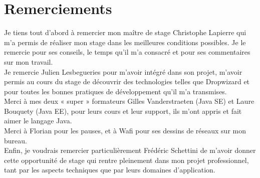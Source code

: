 \chapter*{Remerciements}


Je tiens tout d’abord à remercier mon maître de stage Christophe Lapierre qui m’a permis de réaliser mon stage dans les meilleures conditions possibles. 
Je le remercie pour ses conseils, le temps qu’il m’a consacré et pour ses commentaires sur mon travail. \\

Je remercie Julien Lesbegueries pour m'avoir intégré dans son projet, m'avoir permis au cours du stage de découvrir des technologies telles que Dropwizard et pour toutes les bonnes pratiques de développement qu'il m'a transmises.\\

Merci à mes deux « super » formateurs Gilles Vanderstraeten (Java SE) et Laure Bouquety (Java EE), pour leurs cours et leur support, ils m'ont appris et fait aimer le langage Java. \\

Merci à Florian pour les pauses, et à Wafi pour ses dessins de réseaux sur mon bureau.\\

Enfin, je voudrais remercier particulièrement Frédéric Schettini de m’avoir donner cette opportunité de stage qui rentre pleinement dans mon projet professionnel, tant par les aspects techniques que par leurs domaines d'application. \\
